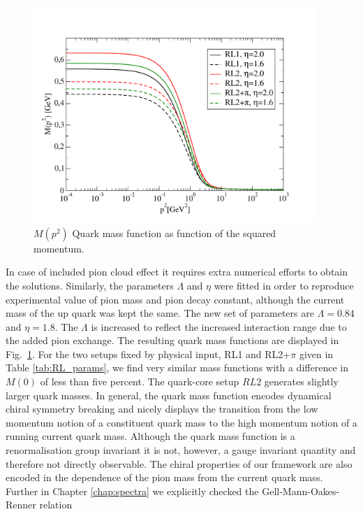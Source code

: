  \begin{figure}[t]
 \begin{center}
  \includegraphics[width=0.95\textwidth,clip]{figures/mass}
 \end{center}
 \caption{$M(p^2)$ Quark mass function as function of the squared momentum.}\label{fig:RL_vs_PS}
\end{figure}
In case of included pion cloud effect it requires extra numerical efforts to obtain the solutions. Similarly, the parameters $\Lambda$ and $\eta$ were fitted in order to reproduce experimental value of pion mass and pion decay constant, although the current mass of the up quark was kept the same. The new set of parameters are $\Lambda=0.84$ and $\eta=1.8$. The $\Lambda$ is increased to reflect the increased interaction range due to the added pion exchange. The resulting quark mass functions are displayed in Fig.~\ref{fig:RL_vs_PS}. For the 
two setups fixed by physical input, RL1 and RL2+$\pi$ given in Table \ref{tab:RL_params},
we find very similar mass functions with a difference in $M(0)$ of less than 
five percent. The quark-core setup $RL2$ generates slightly larger quark masses.
In general, the quark mass function encodes dynamical chiral symmetry breaking and 
nicely displays the transition from the low momentum notion of a constituent quark 
mass to the high momentum notion of a running current quark mass. Although the 
quark mass function is a renormalisation group invariant it is not, however, a 
gauge invariant quantity and therefore not directly observable. The chiral properties 
of our framework are also encoded in the dependence of the pion mass from the 
current quark mass. Further in Chapter \ref{chap:spectra} we explicitly checked the Gell-Mann-Oakes-Renner relation
